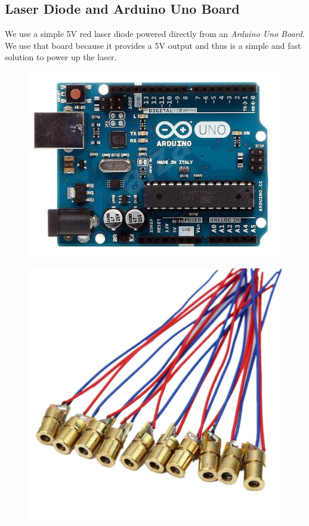 \subsection{Laser Diode and Arduino Uno Board}
We use a simple 5V red laser diode powered directly from an \emph{Arduino Uno Board}. We use that board because it provides a 5V output and thus is a simple and fast solution to power up the laser.
\begin{figure}
\centering
\begin{minipage}{.5\textwidth}
  \centering
  \includegraphics[width=\linewidth]{img/arduino.jpg}
  \label{fig:arduino}
\end{minipage}%
\begin{minipage}{.5\textwidth}
  \centering
  \includegraphics[width=.75\linewidth]{img/diode.jpg}
  \label{fig:diode}
\end{minipage}
\end{figure}
